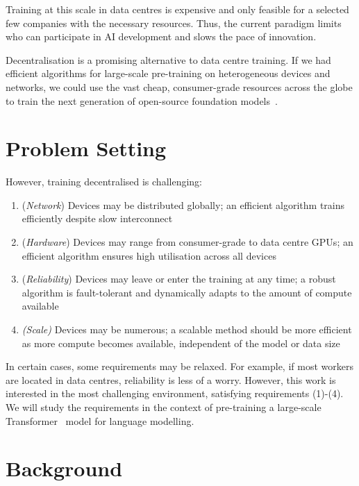 \documentclass[conference, 10pt]{IEEEtran}
\begin{document}
Training at this scale in data centres is expensive and only feasible for a
selected few companies with the necessary resources. Thus, the current paradigm
limits who can participate in AI development and slows the pace of innovation.

Decentralisation is a promising alternative to data centre training. If we had
efficient algorithms for large-scale pre-training on heterogeneous devices and
networks, we could use the vast cheap, consumer-grade resources across the globe
to train the next generation of open-source foundation
models~\cite{weisser2024}.

\section{Problem Setting}

However, training decentralised is challenging:

\begin{enumerate}[label=(\arabic*)]
  \item (\textit{Network}) Devices may be distributed globally; an efficient
    algorithm trains efficiently despite slow interconnect
  \item (\textit{Hardware}) Devices may range from consumer-grade to
    data centre GPUs; an efficient algorithm  ensures high utilisation across
    all devices
  \item (\textit{Reliability}) Devices may leave or enter the training at any
    time; a robust algorithm is fault-tolerant and dynamically adapts to the
    amount of compute available
  \item \textit{(Scale)} Devices may be numerous; a scalable method should be
    more efficient as more compute becomes available, independent of the model or
    data size
\end{enumerate}

In certain cases, some requirements may be relaxed. For example, if most workers
are located in data centres, reliability is less of a worry. However, this work
is interested in the most challenging environment, satisfying requirements
(1)-(4).  We will study the requirements in the context of pre-training a
large-scale Transformer~\cite{vaswani2017} model for language modelling.

\section{Background} 
\end{document}

